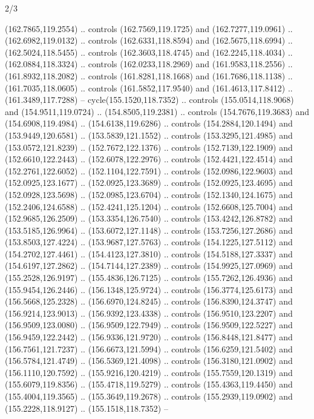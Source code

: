 \begin{flagdescription}{2/3}
\begin{scope}[shift={(0.5\flaglength,0.5)},scale=\flagwidth/320]
\begin{scope}[y=0.8pt, x=0.8pt, yscale=-1,shift={(-118.3,-146)}]
  (162.7865,119.2554) .. controls (162.7569,119.1725) and (162.7277,119.0961) ..
  (162.6982,119.0132) .. controls (162.6331,118.8594) and (162.5675,118.6994) ..
  (162.5024,118.5455) .. controls (162.3603,118.4745) and (162.2245,118.4034) ..
  (162.0884,118.3324) .. controls (162.0233,118.2969) and (161.9583,118.2556) ..
  (161.8932,118.2082) .. controls (161.8281,118.1668) and (161.7686,118.1138) ..
  (161.7035,118.0605) .. controls (161.5852,117.9540) and (161.4613,117.8412) ..
  (161.3489,117.7288) -- cycle(155.1520,118.7352) .. controls
  (155.0514,118.9068) and (154.9511,119.0724) .. (154.8505,119.2381) .. controls
  (154.7676,119.3683) and (154.6908,119.4984) .. (154.6138,119.6286) .. controls
  (154.2884,120.1494) and (153.9449,120.6581) .. (153.5839,121.1552) .. controls
  (153.3295,121.4985) and (153.0572,121.8239) .. (152.7672,122.1376) .. controls
  (152.7139,122.1909) and (152.6610,122.2443) .. (152.6078,122.2976) .. controls
  (152.4421,122.4514) and (152.2761,122.6052) .. (152.1104,122.7591) .. controls
  (152.0986,122.9603) and (152.0925,123.1677) .. (152.0925,123.3689) .. controls
  (152.0925,123.4695) and (152.0928,123.5698) .. (152.0985,123.6704) .. controls
  (152.1340,124.1675) and (152.2406,124.6588) .. (152.4241,125.1204) .. controls
  (152.6608,125.7004) and (152.9685,126.2509) .. (153.3354,126.7540) .. controls
  (153.4242,126.8782) and (153.5185,126.9964) .. (153.6072,127.1148) .. controls
  (153.7256,127.2686) and (153.8503,127.4224) .. (153.9687,127.5763) .. controls
  (154.1225,127.5112) and (154.2702,127.4461) .. (154.4123,127.3810) .. controls
  (154.5188,127.3337) and (154.6197,127.2862) .. (154.7144,127.2389) .. controls
  (154.9925,127.0969) and (155.2528,126.9197) .. (155.4836,126.7125) .. controls
  (155.7262,126.4936) and (155.9454,126.2446) .. (156.1348,125.9724) .. controls
  (156.3774,125.6173) and (156.5668,125.2328) .. (156.6970,124.8245) .. controls
  (156.8390,124.3747) and (156.9214,123.9013) .. (156.9392,123.4338) .. controls
  (156.9510,123.2207) and (156.9509,123.0080) .. (156.9509,122.7949) .. controls
  (156.9509,122.5227) and (156.9459,122.2442) .. (156.9336,121.9720) .. controls
  (156.8448,121.8477) and (156.7561,121.7237) .. (156.6673,121.5994) .. controls
  (156.6259,121.5402) and (156.5784,121.4749) .. (156.5369,121.4098) .. controls
  (156.3180,121.0902) and (156.1110,120.7592) .. (155.9216,120.4219) .. controls
  (155.7559,120.1319) and (155.6079,119.8356) .. (155.4718,119.5279) .. controls
  (155.4363,119.4450) and (155.4004,119.3565) .. (155.3649,119.2678) .. controls
  (155.2939,119.0902) and (155.2228,118.9127) .. (155.1518,118.7352) --

\end{scope}
\end{scope}
\end{flagdescription}
